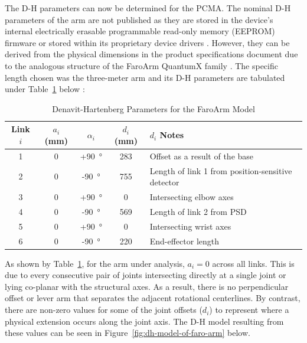 The D-H parameters can now be determined for the PCMA. The nominal D-H parameters of the arm are not published as they are stored in the device's internal electrically erasable programmable read-only memory (EEPROM) firmware or stored within its proprietary device drivers \citep{Faro:2024}. However, they can be derived from the physical dimensions in the product specifications document due to the analogous structure of the FaroArm QuantumX family \citep{Faro:2024}. The specific length chosen was the three-meter arm and its D-H parameters are tabulated under Table~\ref{tab:SID_table} below \citep{Faro:2024}:
\begin{table}[H]
	\centering
	\caption{Denavit-Hartenberg Parameters for the FaroArm Model}
	\label{tab:SID_table}
	\begin{tabular}{|c|c|c|c|p{6.5cm}|}
		\hline
		\textbf{Link $i$} & \textbf{$a_i$ (mm)} & \textbf{$\alpha_i$} & \textbf{$d_i$ (mm)} & \textbf{$d_i$ Notes} \\ \hline
		1 & 0 & +\SI{90}{\degree} & 283 & Offset as a result of the base \\ \hline
		2 & 0 & -\SI{90}{\degree} & 755 & Length of link 1 from position-sensitive detector \\ \hline
		3 & 0 & +\SI{90}{\degree} & 0 & Intersecting elbow axes\footnotemark \\ \hline
		4 & 0 & -\SI{90}{\degree} & 569 & Length of link 2 from PSD \\ \hline
		5 & 0 & +\SI{90}{\degree} & 0 & Intersecting wrist axes\footnotemark \\ \hline
		6 & 0 & -\SI{90}{\degree} & 220 & End-effector length \\ \hline
	\end{tabular}
\end{table}
As shown by Table~\ref{tab:SID_table}, for the arm under analysis, $a_i=0$ across all links. This is due to every consecutive pair of joints intersecting directly at a single joint or lying co-planar with the structural axes. As a result, there is no perpendicular offset or lever arm that separates the adjacent rotational centerlines. By contrast, there are non-zero values for some of the joint offsets ($d_i$) to represent where a physical extension occurs along the joint axis. The D-H model resulting from these values can be seen in Figure~\ref{fig:dh-model-of-faro-arm} below.

